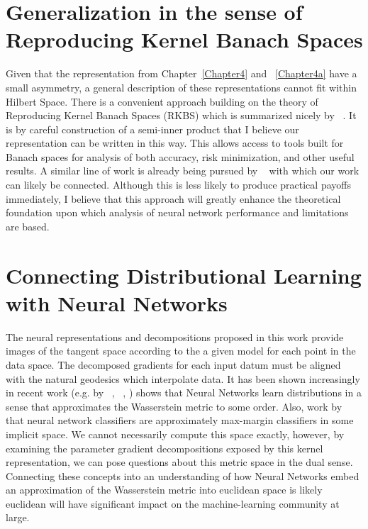 \section{Generalization in the sense of Reproducing Kernel Banach Spaces}
Given that the representation from Chapter~\ref{Chapter4} and
~\ref{Chapter4a} have a small asymmetry, a general description of
these representations cannot fit within Hilbert Space. There is a
convenient approach building on the theory of Reproducing Kernel
Banach Spaces (RKBS) which is summarized nicely by
~\citet{zhang2009reproducing}. It is by careful construction of a
semi-inner product that I believe our representation can be written in
this way. This allows access to tools built for Banach spaces for
analysis of both accuracy, risk minimization, and other useful
results. A similar line of work is already being pursued by
~\citet{shilton_gradient_2023} with which our work can likely be
connected. Although this is less likely to produce practical
payoffs immediately, I believe that this approach will greatly enhance
the theoretical foundation upon which analysis of neural network
performance and limitations are based. 

\section{Connecting Distributional Learning with Neural Networks}

The neural representations and decompositions proposed in this work
provide images of the tangent space according to the
a given model for each point in the data space. The decomposed gradients for each input datum must be aligned with the natural geodesics which interpolate data. It has been shown increasingly in recent work
(e.g. by  ~\citet{lu2020universal}, ~\citet{yang2022capacity}, \citet{altekruger_neural_2023}) shows that Neural Networks
learn distributions in a sense that approximates the Wasserstein
metric to some order. Also, work by ~\citet{chizat2020maxmargin} that neural network
classifiers are approximately max-margin classifiers in some
implicit space. We cannot necessarily compute this space exactly,
however, by examining the parameter gradient decompositions exposed by this kernel representation, we can pose questions about this metric space in the
dual sense. Connecting these concepts into an
understanding of how Neural Networks embed an approximation of the
Wasserstein metric into euclidean space is likely
euclidean will have significant impact on the machine-learning
community at large. 



